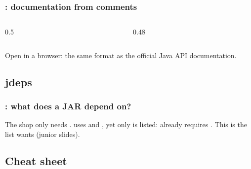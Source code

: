 \documentclass[aspectratio=169,10pt,compress]{beamer}
\begin{document}
\begin{frame}[t,fragile] \frametitle{: documentation from comments}
  \begin{columns}[T]
    \begin{column}{0.5\textwidth}
    \end{column}
    \begin{column}{0.48\textwidth}
    \end{column}
  \end{columns}

  \vspace{0.1em}
  \small Open  in a browser: the same format as the official Java API documentation.
\end{frame}

\subsection[jdeps]{jdeps}




\begin{frame}[t,fragile] \frametitle{: what does a JAR depend on?}

  \vspace{0.1em}
  \small
  The shop only needs .  uses  and , yet only 
  is listed:  already requires . This is the list  wants (junior slides).
\end{frame}


\subsection[Cheat sheet]{Cheat sheet}
\end{document}
